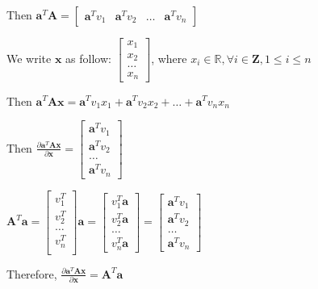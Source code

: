 \documentclass[12pt]{article}
\newcommand{\Rbb}{\mathbb{R}}
\newcommand{\Z}{\mathbf{Z}}
\begin{document}
\begin{enumerate}
\begin{enumerate}
            Then $\pmb{a}^T\pmb{A} = 
            \begin{bmatrix}
                \pmb{a}^Tv_1 & \pmb{a}^Tv_2 & \dots &\pmb{a}^Tv_n
            \end{bmatrix}$

            We write $\pmb{x}$ as follow:
            $\begin{bmatrix}
                x_1 \\
                x_2 \\
                \dots \\
                x_n
            \end{bmatrix}$, where $x_i \in \Rbb, \forall i \in \Z, 1\le i \le n$

            Then $\pmb{a}^T\pmb{Ax} = 
                \pmb{a}^Tv_1x_1 + \pmb{a}^Tv_2x_2 + \dots + \pmb{a}^Tv_nx_n$

            Then $\frac{\partial \pmb{a}^T\pmb{Ax}}{\partial \pmb{x}} = 
            \begin{bmatrix}
                \pmb{a}^Tv_1 \\ \pmb{a}^Tv_2 \\ \dots \\ \pmb{a}^Tv_n
            \end{bmatrix}$

            $\pmb{A}^T\pmb{a} = \begin{bmatrix}
                v_1^T \\
                v_2^T \\
                \dots \\
                v_n^T \\
            \end{bmatrix} \pmb{a} =
            \begin{bmatrix}
                v_1^T\pmb{a} \\
                v_2^T\pmb{a} \\
                \dots \\
                v_n^T\pmb{a}
            \end{bmatrix} = 
            \begin{bmatrix}
                \pmb{a}^Tv_1 \\ \pmb{a}^Tv_2 \\ \dots \\ \pmb{a}^Tv_n
            \end{bmatrix}
            $

            Therefore, $\frac{\partial \pmb{a}^T\pmb{Ax}}{\partial \pmb{x}} = \pmb{A}^T\pmb{a}$
            

\end{enumerate}
\end{enumerate}
\end{document}
